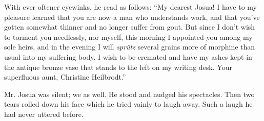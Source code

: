 \documentclass[12pt,a4paper]{article}
\begin{document}
With ever oftener eyewinks, he read as follows: “My dearest Josua! I have to my pleasure learned that you are now a man who understands work, and that you’ve gotten somewhat thinner and no longer suffer from gout. But since I don’t wish to torment you needlessly, nor myself, this morning I appointed you among my sole heirs, and in the evening I will \textit{sprütz} several grains more of morphine than usual into my suffering body. I wish to be cremated and have my ashes kept in the antique bronze vase that stands to the left on my writing desk. Your superfluous aunt, Christine Heilbrodt.”

Mr. Josua was silent; we as well. He stood and nudged his spectacles. Then two tears rolled down his face which he tried vainly to laugh away. Such a laugh he had never uttered before.
\end{document}

